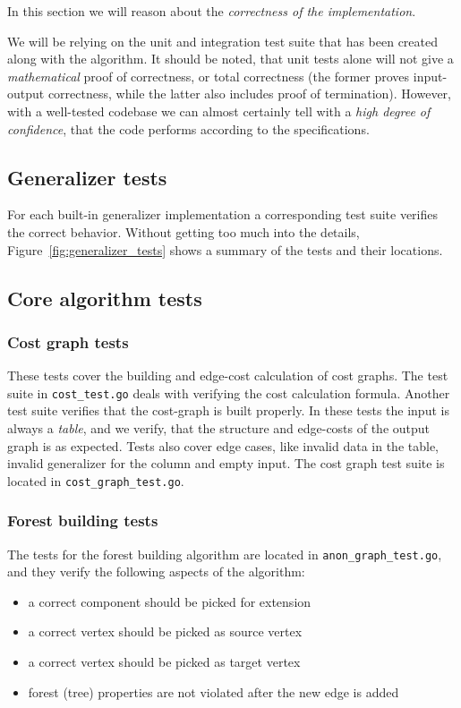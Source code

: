 In this section we will reason about the \emph{correctness of the implementation}.

We will be relying on the unit and integration test suite that has been created along with the algorithm.
It should be noted, that unit tests alone will not give a \emph{mathematical} proof of correctness, or total correctness (the former proves input-output correctness, while the latter also includes proof of termination). However, with a well-tested codebase we can almost certainly tell with a \emph{high degree of confidence}, that the code performs according to the specifications.

\subsection{Generalizer tests}

For each built-in generalizer implementation a corresponding test suite verifies the correct behavior. Without getting too much into the details, Figure~\ref{fig:generalizer_tests} shows a summary of the tests and their locations.

\vspace{\baselineskip}


\subsection{Core algorithm tests}

\subsubsection{Cost graph tests}
These tests cover the building and edge-cost calculation of cost graphs. The test suite in \texttt{cost\_test.go} deals with verifying the cost calculation formula. Another test suite verifies that the  cost-graph is built properly. In these tests the input is always a \emph{table}, and we verify, that the structure and edge-costs of the output graph is as expected. Tests also cover edge cases, like invalid data in the table, invalid generalizer for the column and empty input. The cost graph test suite is located in \texttt{cost\_graph\_test.go}.

\subsubsection{Forest building tests}
The tests for the forest building algorithm are located in \texttt{anon\_graph\_test.go}, and they verify the following aspects of the algorithm:
\begin{itemize}
    \item a correct component should be picked for extension
    \item a correct vertex should be picked as source vertex
    \item a correct vertex should be picked as target vertex
    \item forest (tree) properties are not violated after the new edge is added
\end{itemize}

